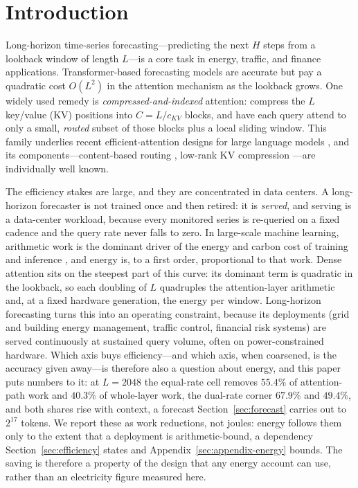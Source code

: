 \section{Introduction}
\label{sec:intro}

Long-horizon time-series forecasting---predicting the next $H$ steps from a
lookback window of length $L$---is a core task in energy, traffic, and
finance applications. Transformer-based forecasting models \citep{zhou2021informer,nie2023patchtst,liu2024itransformer}
are accurate but pay a quadratic cost $O(L^2)$ in the attention mechanism as
the lookback grows. One widely used remedy is \emph{compressed-and-indexed}
attention: compress the $L$ key/value (KV) positions into $C = L / c_{KV}$
blocks, and have each query attend to only a small, \emph{routed} subset of
those blocks plus a local sliding window. This family underlies recent
efficient-attention designs for large language models
\citep{yuan2025nsa,deepseekv4_2026}, and its components---content-based
routing \citep{roy2020routing}, low-rank KV compression
\citep{deepseekv2_2024}---are individually well known.

The efficiency stakes are large, and they are concentrated in data centers.
A long-horizon forecaster is not trained once and then retired: it is
\emph{served}, and serving is a data-center workload, because every monitored
series is re-queried on a fixed cadence and the query rate never falls to
zero. In large-scale machine learning, arithmetic work is the dominant driver
of the energy and carbon cost of training and inference
\citep{strubell2019energy,patterson2021carbon,schwartz2020green,wu2022sustainable},
and energy is, to a first order, proportional to that work. Dense attention
sits on the steepest part of this curve: its dominant term is quadratic in the
lookback, so each doubling of $L$ quadruples the attention-layer arithmetic
and, at a fixed hardware generation, the energy per window. Long-horizon
forecasting turns this into an operating constraint, because its deployments
(grid and building energy management, traffic control, financial risk
systems) are served continuously at sustained query volume, often on
power-constrained hardware. Which axis buys efficiency---and which axis, when
coarsened, is the accuracy given away---is therefore also a question about
energy, and this paper puts numbers to it: at $L{=}2048$ the equal-rate cell
removes $55.4\%$ of attention-path work and $40.3\%$ of whole-layer work, the
dual-rate corner $67.9\%$ and $49.4\%$, and both shares rise with context, a
forecast Section~\ref{sec:forecast} carries out to $2^{17}$ tokens. We report
these as work reductions, not joules:
energy follows them only to the extent that a deployment is arithmetic-bound,
a dependency Section~\ref{sec:efficiency} states and
Appendix~\ref{sec:appendix-energy} bounds. The saving is therefore a property
of the design that any energy account can use, rather than an electricity
figure measured here.


